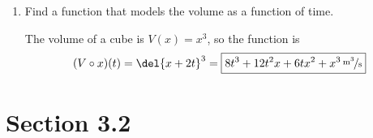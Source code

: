 \documentclass{exam}
\begin{document}
\begin{enumerate}
\begin{enumerate}[a]
        \item Find a function that models the volume as a function of time.
          \begin{solution}
              The volume of a cube is $V(x) = x^3$, so the function is 
              \[
                (V \circ x)(t) = \del{x + 2t}^3 = \boxed{\unitfrac[8t^3 + 12t^2x + 6tx^2 + x^3]{m^3}{s}}
              \]
          \end{solution}

      \end{enumerate}

  \end{enumerate}

  \ifprintanswers{}

  \pagebreak

    \section{Section 3.2}
\end{document}
